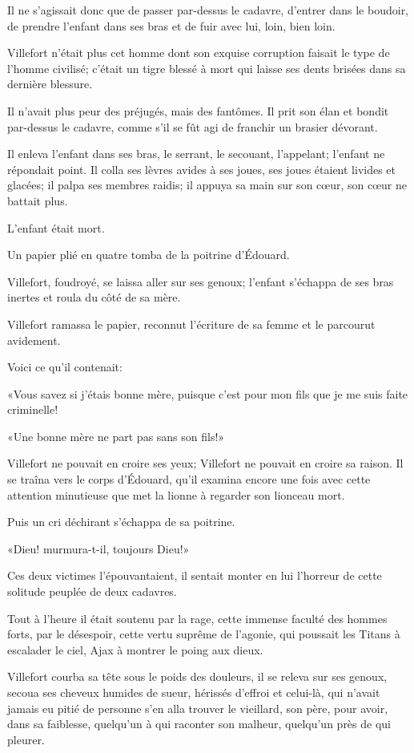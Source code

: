 Il ne s'agissait donc que de passer par-dessus le cadavre, d'entrer dans le boudoir, de prendre l'enfant dans ses bras et de fuir avec lui, loin, bien loin. 

Villefort n'était plus cet homme dont son exquise corruption faisait le type de l'homme civilisé; c'était un tigre blessé à mort qui laisse ses dents brisées dans sa dernière blessure. 

Il n'avait plus peur des préjugés, mais des fantômes. Il prit son élan et bondit par-dessus le cadavre, comme s'il se fût agi de franchir un brasier dévorant. 

Il enleva l'enfant dans ses bras, le serrant, le secouant, l'appelant; l'enfant ne répondait point. Il colla ses lèvres avides à ses joues, ses joues étaient livides et glacées; il palpa ses membres raidis; il appuya sa main sur son cœur, son cœur ne battait plus. 

L'enfant était mort. 

Un papier plié en quatre tomba de la poitrine d'Édouard. 

Villefort, foudroyé, se laissa aller sur ses genoux; l'enfant s'échappa de ses bras inertes et roula du côté de sa mère. 

Villefort ramassa le papier, reconnut l'écriture de sa femme et le parcourut avidement. 

Voici ce qu'il contenait: 

«Vous savez si j'étais bonne mère, puisque c'est pour mon fils que je me suis faite criminelle! 

«Une bonne mère ne part pas sans son fils!» 

Villefort ne pouvait en croire ses yeux; Villefort ne pouvait en croire sa raison. Il se traîna vers le corps d'Édouard, qu'il examina encore une fois avec cette attention minutieuse que met la lionne à regarder son lionceau mort. 

Puis un cri déchirant s'échappa de sa poitrine. 

«Dieu! murmura-t-il, toujours Dieu!» 

Ces deux victimes l'épouvantaient, il sentait monter en lui l'horreur de cette solitude peuplée de deux cadavres. 

Tout à l'heure il était soutenu par la rage, cette immense faculté des hommes forts, par le désespoir, cette vertu suprême de l'agonie, qui poussait les Titans à escalader le ciel, Ajax à montrer le poing aux dieux. 

Villefort courba sa tête sous le poids des douleurs, il se releva sur ses genoux, secoua ses cheveux humides de sueur, hérissés d'effroi et celui-là, qui n'avait jamais eu pitié de personne s'en alla trouver le vieillard, son père, pour avoir, dans sa faiblesse, quelqu'un à qui raconter son malheur, quelqu'un près de qui pleurer. 

